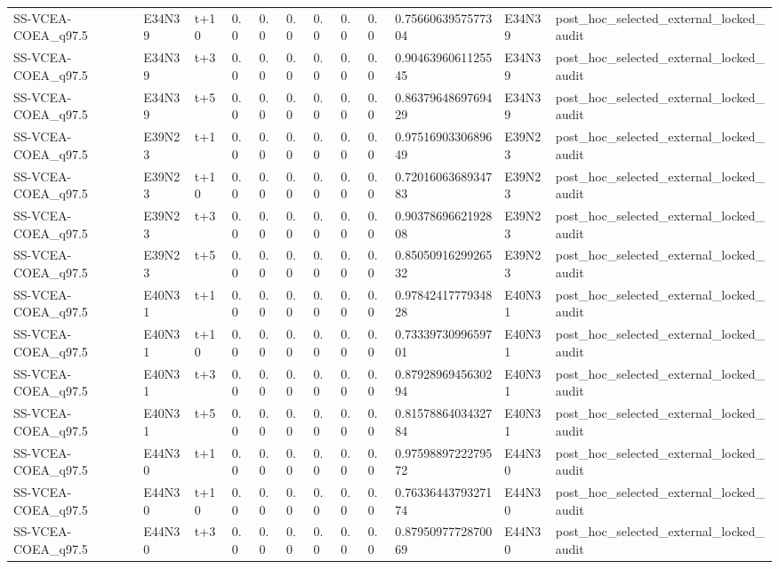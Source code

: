 \begin{landscape}
\begin{longtable}{llllllllllll}
SS-VCEA-COEA\_q97.5 & E34N39 & t+10 & 0.0 & 0.0 & 0.0 & 0.0 & 0.0 & 0.0 & 0.7566063957577304 & E34N39 & post\_hoc\_selected\_external\_locked\_audit \\
SS-VCEA-COEA\_q97.5 & E34N39 & t+3 & 0.0 & 0.0 & 0.0 & 0.0 & 0.0 & 0.0 & 0.9046396061125545 & E34N39 & post\_hoc\_selected\_external\_locked\_audit \\
SS-VCEA-COEA\_q97.5 & E34N39 & t+5 & 0.0 & 0.0 & 0.0 & 0.0 & 0.0 & 0.0 & 0.8637964869769429 & E34N39 & post\_hoc\_selected\_external\_locked\_audit \\
SS-VCEA-COEA\_q97.5 & E39N23 & t+1 & 0.0 & 0.0 & 0.0 & 0.0 & 0.0 & 0.0 & 0.9751690330689649 & E39N23 & post\_hoc\_selected\_external\_locked\_audit \\
SS-VCEA-COEA\_q97.5 & E39N23 & t+10 & 0.0 & 0.0 & 0.0 & 0.0 & 0.0 & 0.0 & 0.7201606368934783 & E39N23 & post\_hoc\_selected\_external\_locked\_audit \\
SS-VCEA-COEA\_q97.5 & E39N23 & t+3 & 0.0 & 0.0 & 0.0 & 0.0 & 0.0 & 0.0 & 0.9037869662192808 & E39N23 & post\_hoc\_selected\_external\_locked\_audit \\
SS-VCEA-COEA\_q97.5 & E39N23 & t+5 & 0.0 & 0.0 & 0.0 & 0.0 & 0.0 & 0.0 & 0.8505091629926532 & E39N23 & post\_hoc\_selected\_external\_locked\_audit \\
SS-VCEA-COEA\_q97.5 & E40N31 & t+1 & 0.0 & 0.0 & 0.0 & 0.0 & 0.0 & 0.0 & 0.9784241777934828 & E40N31 & post\_hoc\_selected\_external\_locked\_audit \\
SS-VCEA-COEA\_q97.5 & E40N31 & t+10 & 0.0 & 0.0 & 0.0 & 0.0 & 0.0 & 0.0 & 0.7333973099659701 & E40N31 & post\_hoc\_selected\_external\_locked\_audit \\
SS-VCEA-COEA\_q97.5 & E40N31 & t+3 & 0.0 & 0.0 & 0.0 & 0.0 & 0.0 & 0.0 & 0.8792896945630294 & E40N31 & post\_hoc\_selected\_external\_locked\_audit \\
SS-VCEA-COEA\_q97.5 & E40N31 & t+5 & 0.0 & 0.0 & 0.0 & 0.0 & 0.0 & 0.0 & 0.8157886403432784 & E40N31 & post\_hoc\_selected\_external\_locked\_audit \\
SS-VCEA-COEA\_q97.5 & E44N30 & t+1 & 0.0 & 0.0 & 0.0 & 0.0 & 0.0 & 0.0 & 0.9759889722279572 & E44N30 & post\_hoc\_selected\_external\_locked\_audit \\
SS-VCEA-COEA\_q97.5 & E44N30 & t+10 & 0.0 & 0.0 & 0.0 & 0.0 & 0.0 & 0.0 & 0.7633644379327174 & E44N30 & post\_hoc\_selected\_external\_locked\_audit \\
SS-VCEA-COEA\_q97.5 & E44N30 & t+3 & 0.0 & 0.0 & 0.0 & 0.0 & 0.0 & 0.0 & 0.8795097772870069 & E44N30 & post\_hoc\_selected\_external\_locked\_audit \\

\end{longtable}
\end{landscape}
